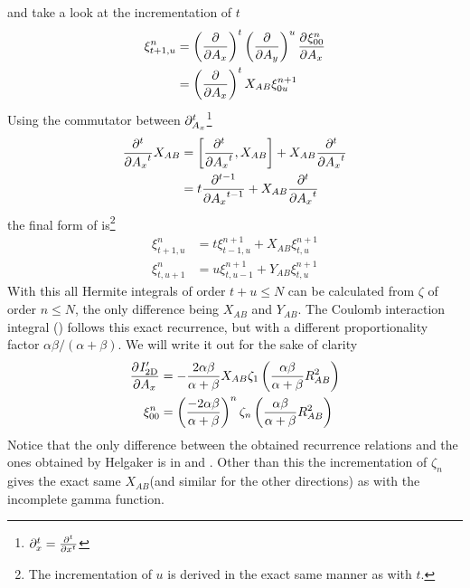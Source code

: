     and take a look at the incrementation of $t$
        \begin{align}
            \xi^n_{t+1,u} &= \prdp{A_x}{t}\prdp{A_y}{u} \prd{A_x}[\xi^n_{00}]
            \nonumber \\
            &= \prdp{A_x}{t}X_{AB}\xi^{n+1}_{0u}
            \label{eq:Rtincr}
        \end{align}
    Using the commutator between
    $\mathrm{\partial}^t_{A_x}$\footnote{$\prtl^t_x=\prd{x}[][t]$}
        \begin{align}
            \prd{A_x}[][t] X_{AB} &= \left[\prd{A_x}[][t], X_{AB}\right] +
            X_{AB}\prd{A_x}[][t] \nonumber \\
            &= t\prd{A_x}[][t-1] + X_{AB}\prd{A_x}[][t]
        \end{align}
    the final form of  is\footnote{The incrementation of $u$ is
    derived in the exact same manner as with $t$.}
        \begin{equation}
            \begin{aligned}
                \xi^n_{t+1,u} &= t\xi^{n+1}_{t-1,u} + X_{AB}\xi^{n+1}_{t,u} \\
                \xi^n_{t,u+1} &= u\xi^{n+1}_{t,u-1} + Y_{AB}\xi^{n+1}_{t,u}
            \end{aligned}
        \end{equation}
    With this all Hermite integrals of order $t+u\leq N$ can be calculated from
    $\zeta$ of order $n\leq N$, the only difference being $X_{AB}$ and
    $Y_{AB}$. The Coulomb interaction integral
    () follows this exact recurrence, but
    with a different proportionality factor $\alpha\beta/(\alpha+\beta)$. We
    will write it out for the sake of clarity
        \begin{equation}
            \begin{aligned}
                \prd{A_x}[I'_{\text{2D}}] &= -\frac{2\alpha\beta}{\alpha+\beta}
                X_{AB}\zeta_1\left(\frac{\alpha\beta}{\alpha+\beta}R^2_{AB}\right)
                \\
                \xi^n_{00} &= \left(\frac{-2\alpha\beta}{\alpha+\beta}\right)^n
                \zeta_n\left(\frac{\alpha\beta}{\alpha+\beta} R^2_{AB}\right)
            \end{aligned}
            \label{eq:recurrInteraction}
        \end{equation}
    Notice that the only difference between the obtained recurrence relations
    and the ones obtained by Helgaker\cite{HelgakerGauss} is in
     and . Other than this the
    incrementation of $\zeta_n$ gives the exact same $X_{AB}$(and similar for
    the other directions) as with the incomplete gamma function.

